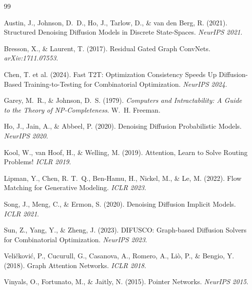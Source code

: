\documentclass[11pt,a4paper]{article}
\begin{document}

\begin{thebibliography}{99}

Austin, J., Johnson, D.~D., Ho, J., Tarlow, D., \& van den Berg, R. (2021).
Structured Denoising Diffusion Models in Discrete State-Spaces.
\textit{NeurIPS 2021}.

Bresson, X., \& Laurent, T. (2017).
Residual Gated Graph ConvNets.
\textit{arXiv:1711.07553}.

Chen, T. et al. (2024).
Fast T2T: Optimization Consistency Speeds Up Diffusion-Based Training-to-Testing
for Combinatorial Optimization.
\textit{NeurIPS 2024}.

Garey, M.~R., \& Johnson, D.~S. (1979).
\textit{Computers and Intractability: A Guide to the Theory of NP-Completeness}.
W.~H. Freeman.

Ho, J., Jain, A., \& Abbeel, P. (2020).
Denoising Diffusion Probabilistic Models.
\textit{NeurIPS 2020}.

Kool, W., van Hoof, H., \& Welling, M. (2019).
Attention, Learn to Solve Routing Problems!
\textit{ICLR 2019}.

Lipman, Y., Chen, R. T.~Q., Ben-Hamu, H., Nickel, M., \& Le, M. (2022).
Flow Matching for Generative Modeling.
\textit{ICLR 2023}.

Song, J., Meng, C., \& Ermon, S. (2020).
Denoising Diffusion Implicit Models.
\textit{ICLR 2021}.

Sun, Z., Yang, Y., \& Zheng, J. (2023).
DIFUSCO: Graph-based Diffusion Solvers for Combinatorial Optimization.
\textit{NeurIPS 2023}.

Veli\v{c}kovi\'{c}, P., Cucurull, G., Casanova, A., Romero, A., Li\`{o}, P., \& Bengio, Y. (2018).
Graph Attention Networks.
\textit{ICLR 2018}.

Vinyals, O., Fortunato, M., \& Jaitly, N. (2015).
Pointer Networks.
\textit{NeurIPS 2015}.

\end{thebibliography}
\end{document}
